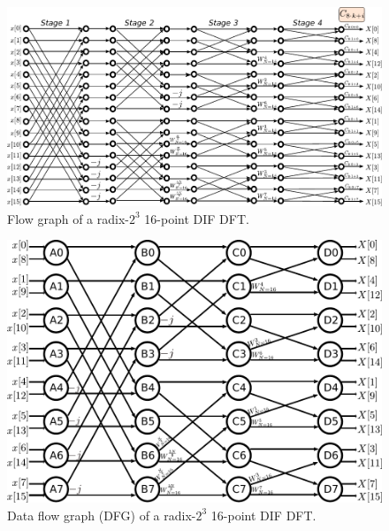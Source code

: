 \begin{frame}

    \begin{figure}[h!] \centering
    \includegraphics[width=0.7\paperwidth]{./image/16points_con.pdf}
    \caption{\footnotesize Flow graph of a radix-$2^3$ 16-point DIF DFT.}
    \end{figure}
\end{frame}
    
\begin{frame}

    \begin{figure}[h!] \centering
    \includegraphics[width=0.5\paperwidth]{./image/16points_dfg.pdf}
    \caption{\footnotesize Data flow graph (DFG) of a radix-$2^3$ 16-point DIF DFT.}
    \end{figure}    
    
\end{frame}